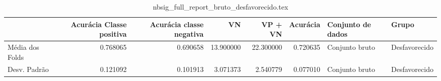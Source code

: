 \begin{table}
\centering
\caption{nbsig_full_report_bruto_desfavorecido.tex}
\label{nbsig_full_report_bruto_desfavorecido.tex}
\begin{tabular}{lrrrrrll}
\toprule
{} &  Acurácia Classe positiva &  Acurácia classe negativa &        VN  &   VP + VN  &  Acurácia & Conjunto de dados &          Grupo \\
\midrule
Média dos Folds &                  0.768065 &                  0.690658 &  13.900000 &  22.300000 &  0.720635 &    Conjunto bruto &  Desfavorecido \\
Desv. Padrão    &                  0.121092 &                  0.101913 &   3.071373 &   2.540779 &  0.077010 &    Conjunto bruto &  Desfavorecido \\
\bottomrule
\end{tabular}
\end{table}
